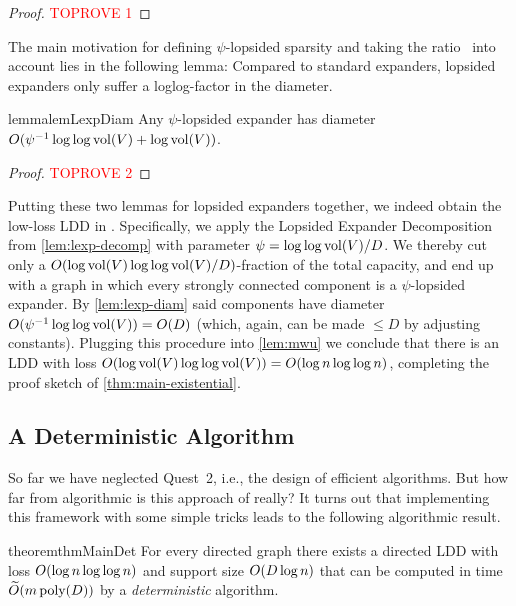 \documentclass[letterpaper,11pt]{article}
\begin{document}
\begin{proof}\textcolor{red}{TOPROVE 1}\end{proof}

The main motivation for defining $\psi$-lopsided sparsity and taking the ratio~ into account lies in the following lemma: Compared to standard expanders, lopsided expanders only suffer a loglog-factor in the diameter.

\begin{restatable}{lemma}{lemLexpDiam} \label{lem:lexp-diam}
	Any $\psi$-lopsided expander has diameter $O(\psi^{-1} \log \log \operatorname{vol}(V) + \log\operatorname{vol}(V))$.
\end{restatable}

\begin{proof}\textcolor{red}{TOPROVE 2}\end{proof}

Putting these two lemmas for lopsided expanders together, we indeed obtain the low-loss LDD in . Specifically, we apply the Lopsided Expander Decomposition from \cref{lem:lexp-decomp} with parameter $\psi = \log\log \operatorname{vol}(V) / D$. We thereby cut only a $O(\log \operatorname{vol}(V) \log\log \operatorname{vol}(V) / D)$-fraction of the total capacity, and end up with a graph in which every strongly connected component is a $\psi$-lopsided expander. By \cref{lem:lexp-diam} said components have diameter $O(\psi^{-1} \log\log \operatorname{vol}(V)) = O(D)$ (which, again, can be made $\leq D$ by adjusting constants). Plugging this procedure into \cref{lem:mwu} we conclude that there is an LDD with loss $O(\log \operatorname{vol}(V) \log\log \operatorname{vol}(V)) = O(\log n \log\log n)$, completing the proof sketch of \cref{thm:main-existential}.

\subsection{A Deterministic Algorithm} \label{sec:overviewDet}
So far we have neglected Quest~2, i.e., the design of efficient algorithms. But how far from algorithmic is this approach of  really? It turns out that implementing this framework with some simple tricks leads to the following algorithmic result.

\begin{restatable}{theorem}{thmMainDet} \label{thm:main-det}
	For every directed graph there exists a directed LDD with loss $O(\log n \log\log n)$ and support size $O(D \log n)$ that can be computed in time $\widetilde{O}(m \operatorname{\text{{\rm poly}}}(D))$ by a \emph{deterministic} algorithm.
\end{restatable}
\end{document}
